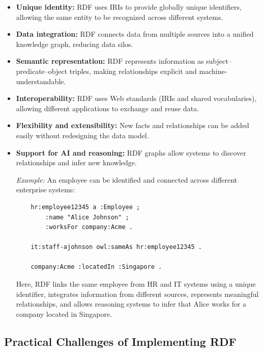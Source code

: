\begin{itemize}
  \item \textbf{Unique identity:} RDF uses IRIs to provide globally unique
        identifiers, allowing the same entity to be recognized across different
        systems.

  \item \textbf{Data integration:} RDF connects data from multiple sources
        into a unified knowledge graph, reducing data silos.

  \item \textbf{Semantic representation:} RDF represents information as
        subject--predicate--object triples, making relationships explicit and
        machine-understandable.

  \item \textbf{Interoperability:} RDF uses Web standards (IRIs and shared
        vocabularies), allowing different applications to exchange and reuse data.

  \item \textbf{Flexibility and extensibility:} New facts and relationships
        can be added easily without redesigning the data model.

  \item \textbf{Support for AI and reasoning:} RDF graphs allow systems to
        discover relationships and infer new knowledge.

        \textit{Example:} An employee can be identified and connected across
        different enterprise systems:

        \begin{verbatim}
    hr:employee12345 a :Employee ;
        :name "Alice Johnson" ;
        :worksFor company:Acme .

    it:staff-ajohnson owl:sameAs hr:employee12345 .

    company:Acme :locatedIn :Singapore .
    \end{verbatim}

        Here, RDF links the same employee from HR and IT systems using a unique
        identifier, integrates information from different sources, represents
        meaningful relationships, and allows reasoning systems to infer that
        Alice works for a company located in Singapore.
\end{itemize}

\subsection{Practical Challenges of Implementing RDF}

